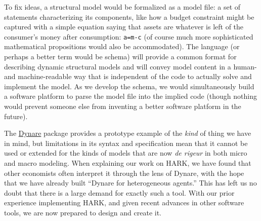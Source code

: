 \documentclass[11pt,pdftex,letterpaper]{article}
\begin{document}
To fix ideas, a structural model would be formalized as a model file: a set of statements characterizing its components, like how a budget constraint might be captured with a simple equation saying that assets are whatever is left of the consumer's money after consumption: \texttt{a=m-c} (of course much more sophisticated mathematical propositions would also be accommodated).  The language (or perhaps a better term would be schema) will provide a common format for describing dynamic structural models and will convey model content in a human- and machine-readable way that is independent of the code to actually solve and implement the model. As we develop the schema, we would simultaneously build a software platform to parse the model file into the implied code (though nothing would prevent someone else from inventing a better software platform in the future). %



The \href{https://www.dynare.org/}{Dynare} package provides a prototype example of the \textit{kind} of thing we have in mind, but limitations in its syntax and specification mean that it cannot be used or extended for the kinds of models that are now \textit{de rigeur} in both micro and macro modeling.  When explaining our work on HARK, we have found that other economists often interpret it through the lens of Dynare, with the hope that we have already built ``Dynare for heterogeneous agents.'' This has left us no doubt that there is a large demand for exactly such a tool. With our prior experience implementing HARK, and given recent advances in other software tools, we are now prepared to design and create it.
\end{document}

